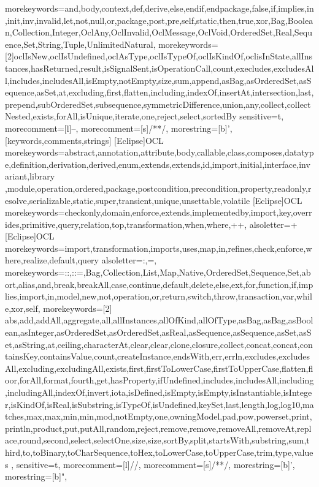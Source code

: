  {
    morekeywords={and,body,context,def,derive,else,endif,endpackage,false,if,implies,in,init,inv,invalid,let,not,null,or,package,post,pre,self,static,then,true,xor,Bag,Boolean,Collection,Integer,OclAny,OclInvalid,OclMessage,OclVoid,OrderedSet,Real,Sequence,Set,String,Tuple,UnlimitedNatural},%
    morekeywords=[2]{oclIsNew,oclIsUndefined,oclAsType,oclIsTypeOf,oclIsKindOf,oclisInState,allInstances,hasReturned,result,isSignalSent,isOperationCall,count,execludes,excludesAll,includes,includesAll,isEmpty,notEmpty,size,sum,append,asBag,asOrderedSet,asSequence,asSet,at,excluding,first,flatten,including,indexOf,insertAt,intersection,last,prepend,subOrderedSet,subsequence,symmetricDifference,union,any,collect,collectNested,exists,forAll,isUnique,iterate,one,reject,select,sortedBy}
    sensitive=t,%
    morecomment=[l]--,%
    morecomment=[s]{/*}{*/},%
    morestring=[b]',%
}[keywords,comments,strings]
[Eclipse]{OCL}{
    morekeywords={abstract,annotation,attribute,body,callable,class,composes,datatype,definition,derivation,derived,enum,extends,extends,id,import,initial,interface,invariant,library ,module,operation,ordered,package,postcondition,precondition,property,readonly,resolve,serializable,static,super,transient,unique,unsettable,volatile}
}
[Eclipse]{OCL}{
    morekeywords={checkonly,domain,enforce,extends,implementedby,import,key,overrides,primitive,query,relation,top,transformation,when,where,++},%
    alsoletter={+}
}
[Eclipse]{OCL}{
    morekeywords={import,transformation,imports,uses,map,in,refines,check,enforce,where,realize,default,query}
}
 {
    alsoletter={:,=},
    morekeywords={::,::=,Bag,Collection,List,Map,Native,OrderedSet,Sequence,Set,abort,alias,and,break,breakAll,case,continue,default,delete,else,ext,for,function,if,implies,import,in,model,new,not,operation,or,return,switch,throw,transaction,var,while,xor,self},%
    morekeywords=[2]{ abs,add,addAll,aggregate,all,allInstances,allOfKind,allOfType,asBag,asBag,asBoolean,asInteger,asOrderedSet,asOrderedSet,asReal,asSequence,asSequence,asSet,asSet,asString,at,ceiling,characterAt,clear,clear,clone,closure,collect,concat,concat,containsKey,containsValue,count,createInstance,endsWith,err,errln,excludes,excludesAll,excluding,excludingAll,exists,first,firstToLowerCase,firstToUpperCase,flatten,floor,forAll,format,fourth,get,hasProperty,ifUndefined,includes,includesAll,including,includingAll,indexOf,invert,iota,isDefined,isEmpty,isEmpty,isInstantiable,isInteger,isKindOf,isReal,isSubstring,isTypeOf,isUndefined,keySet,last,length,log,log10,matches,max,max,min,min,mod,notEmpty,one,owningModel,pad,pow,powerset,print,println,product,put,putAll,random,reject,remove,remove,removeAll,removeAt,replace,round,second,select,selectOne,size,size,sortBy,split,startsWith,substring,sum,third,to,toBinary,toCharSequence,toHex,toLowerCase,toUpperCase,trim,type,values
    },%
    sensitive=t,%
    morecomment=[l]//,%
    morecomment=[s]{/*}{*/},%
    morestring=[b]',%
    morestring=[b]",%
}
